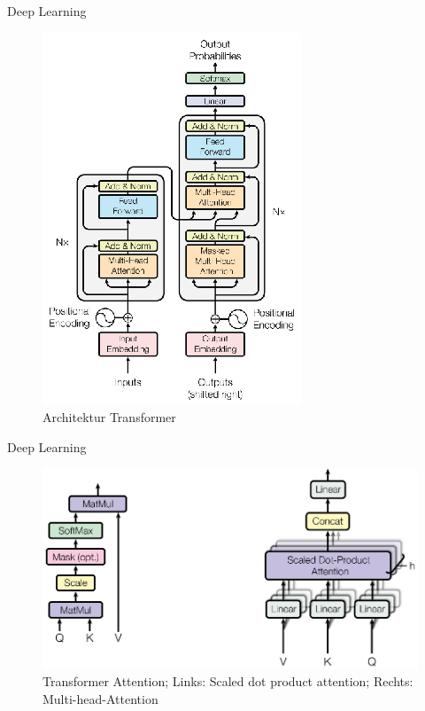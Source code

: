 \documentclass[aspectratio=169]{beamer} %
\begin{document}
\begin{frame}{Deep Learning}
\begin{center}

\begin{figure}


\includegraphics[scale=1.2]{figures/TransformerArchitektur.eps}
\caption{Architektur Transformer}
\end{figure}
\end{center}
\end{frame}


\begin{frame}{Deep Learning}
\begin{center}
\begin{figure}
\includegraphics[scale=0.9]{figures/TransformerAttention.eps}
\caption{Transformer Attention; Links: Scaled dot product attention; Rechts: Multi-head-Attention}
\end{figure}
\end{center}
\end{frame}
\end{document}
